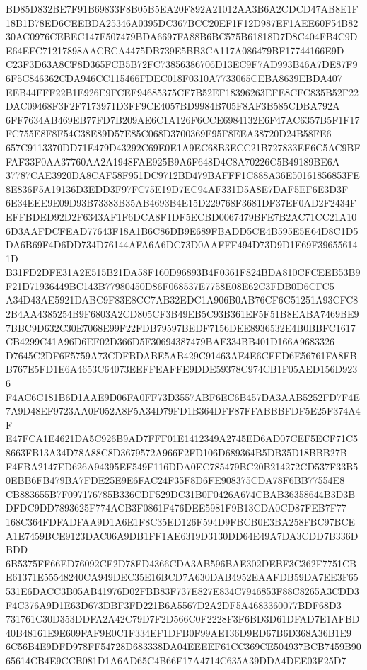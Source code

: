 \documentclass[UTF8,fontset=fandol,zihao=-4,a4paper]{ctexart}
\begin{document}
{{BD85D832BE7F91B69833F8B05B5EA20F892A21012AA3B6A2CDCD47AB8E1F18B1B78ED6CEEBDA25346A0395DC367BCC20EF1F12D987EF1AEE60F54B82
30AC0976CEBEC147F507479BDA6697FA88B6BC575B61818D7D8C404FB4C9DE64EFC71217898AACBCA4475DB739E5BB3CA117A086479BF17744166E9D
C23F3D63A8CF8D365FCB5B72FC73856386706D13EC9F7AD993B46A7DE87F96F5C846362CDA946CC115466FDEC018F0310A7733065CEBA8639EBDA407
EEB44FFF22B1E926E9FCEF94685375CF7B52EF18396263EFE8CFC835B52F22DAC09468F3F2F7173971D3FF9CE4057BD9984B705F8AF3B585CDBA792A
6FF7634AB469EB77FD7B209AE6C1A126F6CCE6984132E6F47AC6357B5F1F17FC755E8F8F54C38E89D57E85C068D3700369F95F8EEA38720D24B58FE6
657C9113370DD71E479D43292C69E0E1A9EC68B3ECC21B727833EF6C5AC9BFFAF33F0AA37760AA2A1948FAE925B9A6F648D4C8A70226C5B49189BE6A
37787CAE3920DA8CAF58F951DC9712BD479BAFFF1C888A36E50161856853FE8E836F5A19136D3EDD3F97FC75E19D7EC94AF331D5A8E7DAF5EF6E3D3F
6E34EEE9E09D93B73383B35AB4693B4E15D229768F3681DF37EF0AD2F2434FEFFBDED92D2F6343AF1F6DCA8F1DF5ECBD0067479BFE7B2AC71CC21A10
6D3AAFDCFEAD77643F18A1B6C86DB9E689FBADD5CE4B595E5E64D8C1D5DA6B69F4D6DD734D76144AFA6A6DC73D0AAFFF494D73D9D1E69F396556141D
B31FD2DFE31A2E515B21DA58F160D96893B4F0361F824BDA810CFCEEB53B9F21D71936449BC143B77980450D86F068537E7758E08E62C3FDB0D6CFC5
A34D43AE5921DABC9F83E8CC7AB32EDC1A906B0AB76CF6C51251A93CFC82B4AA4385254B9F6803A2CD805CF3B49EB5C93B361EF5F51B8EABA7469BE9
7BBC9D632C30E7068E99F22FDB79597BEDF7156DEE8936532E4B0BBFC1617CB4299C41A96D6EF02D366D5F30694387479BAF334BB401D166A9683326
D7645C2DF6F5759A73CDFBDABE5AB429C91463AE4E6CFED6E56761FA8FBB767E5FD1E6A4653C64073EEFFEAFFE9DDE59378C974CB1F05AED156D9236
F4AC6C181B6D1AAE9D06FA0FF73D3557ABF6EC6B457DA3AAB5252FD7F4E7A9D48EF9723AA0F052A8F5A34D79FD1B364DFF87FFABBBFDF5E25F374A4F
E47FCA1E4621DA5C926B9AD7FFF01E1412349A2745ED6AD07CEF5ECF71C58663FB13A34D78A88C8D3679572A966F2FD106D689364B5DB35D18BBB27B
F4FBA2147ED626A94395EF549F116DDA0EC785479BC20B214272CD537F33B50EBB6FB479BA7FDE25E9E6FAC24F35F8D6FE908375CDA78F6BB77554E8
CB883655B7F097176785B336CDF529DC31B0F0426A674CBAB36358644B3D3BDFDC9DD7893625F774ACB3F0861F476DEE5981F9B13CDA0CD87FEB7F77
168C364FDFADFAA9D1A6E1F8C35ED126F594D9FBCB0E3BA258FBC97BCEA1E7459BCE9123DAC06A9DB1FF1AE6319D3130DD64E49A7DA3CDD7B336DBDD
6B5375FF66ED76092CF2D78FD4366CDA3AB596BAE302DEBF3C362F7751CBE61371E55548240CA949DEC35E16BCD7A630DAB4952EAAFDB59DA7EE3F65
531E6DACC3B05AB41976D02FBB83F737E827E834C7946853F88C8265A3CDD3F4C376A9D1E63D673DBF3FD221B6A5567D2A2DF5A4683360077BDF68D3
731761C30D353DDFA2A42C79D7F2D566C0F2228F3F6BD3D61DFAD7E1AFBD40B48161E9E609FAF9E0C1F334EF1DFB0F99AE136D9ED67B6D368A36B1E9
6C56B4E9DFD978FF54728D683338DA04EEEEF61CC369CE504937BCB7459B9065614CB4E9CCB081D1A6AD65C4B66F17A4714C635A39DDA4DEE03F25D7
}}
\end{document}
